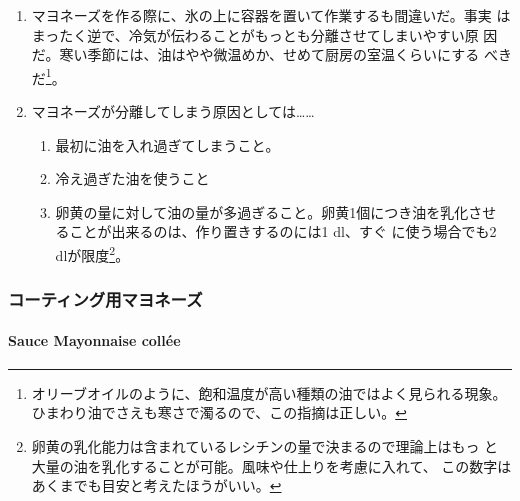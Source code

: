 \begin{recette}
\begin{enumerate}
\def\labelenumi{\arabic{enumi}.}
\setcounter{enumi}{1}
\item
  マヨネーズを作る際に、氷の上に容器を置いて作業するも間違いだ。事実
  はまったく逆で、冷気が伝わることがもっとも分離させてしまいやすい原
  因だ。寒い季節には、油はやや微温めか、せめて厨房の室温くらいにする
  べきだ\footnote{オリーブオイルのように、飽和温度が高い種類の油ではよく見られる現象。ひまわり油でさえも寒さで濁るので、この指摘は正しい。}。
\item
  マヨネーズが分離してしまう原因としては\ldots{}\ldots{}

  \begin{enumerate}
  \def\labelenumii{\arabic{enumii}.}
  \tightlist
  \item
    最初に油を入れ過ぎてしまうこと。
  \item
    冷え過ぎた油を使うこと
  \item
    卵黄の量に対して油の量が多過ぎること。卵黄1個につき油を乳化させ
    ることが出来るのは、作り置きするのには1\troisquarts{} dl、すぐ
    に使う場合でも2 dlが限度\footnote{卵黄の乳化能力は含まれているレシチンの量で決まるので理論上はもっ
      と大量の油を乳化することが可能。風味や仕上りを考慮に入れて、
      この数字はあくまでも目安と考えたほうがいい。}。
  \end{enumerate}
\end{enumerate}

\maeaki

\hypertarget{ux30b3ux30fcux30c6ux30a3ux30f3ux30b0ux7528ux30deux30e8ux30cdux30fcux30ba}{%
\subsubsection{コーティング用マヨネーズ}\label{ux30b3ux30fcux30c6ux30a3ux30f3ux30b0ux7528ux30deux30e8ux30cdux30fcux30ba}}

\hypertarget{mayonnaise-collee}{%
\paragraph{Sauce Mayonnaise collée}\label{mayonnaise-collee}}



\end{recette}
